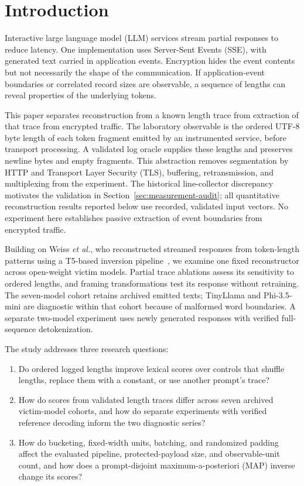 \documentclass[electronics,article,submit,pdftex,moreauthors]{Definitions/mdpi}
\begin{document}
\section{Introduction}
Interactive large language model (LLM) services stream partial responses to reduce latency. One implementation uses Server-Sent Events (SSE), with generated text carried in application events. Encryption hides the event contents but not necessarily the shape of the communication. If application-event boundaries or correlated record sizes are observable, a sequence of lengths can reveal properties of the underlying tokens.

This paper separates reconstruction from a known length trace from extraction of that trace from encrypted traffic. The laboratory observable is the ordered UTF-8 byte length of each token fragment emitted by an instrumented service, before transport processing. A validated log oracle supplies these lengths and preserves newline bytes and empty fragments. This abstraction removes segmentation by HTTP and Transport Layer Security (TLS), buffering, retransmission, and multiplexing from the experiment. The historical line-collector discrepancy motivates the validation in Section~\ref{sec:measurement-audit}; all quantitative reconstruction results reported below use recorded, validated input vectors. No experiment here establishes passive extraction of event boundaries from encrypted traffic.

Building on Weiss \emph{et al.}, who reconstructed streamed responses from token-length patterns using a T5-based inversion pipeline~\cite{weiss2024prompt}, we examine one fixed reconstructor across open-weight victim models. Partial trace ablations assess its sensitivity to ordered lengths, and framing transformations test its response without retraining. The seven-model cohort retains archived emitted texts; TinyLlama and Phi-3.5-mini are diagnostic within that cohort because of malformed word boundaries. A separate two-model experiment uses newly generated responses with verified full-sequence detokenization.

The study addresses three research questions:
\begin{enumerate}[label=\textbf{RQ\arabic*:},leftmargin=4.2em,labelwidth=3.2em,labelsep=0.6em]
    \item Do ordered logged lengths improve lexical scores over controls that shuffle lengths, replace them with a constant, or use another prompt's trace?
    \item How do scores from validated length traces differ across seven archived victim-model cohorts, and how do separate experiments with verified reference decoding inform the two diagnostic series?
    \item How do bucketing, fixed-width units, batching, and randomized padding affect the evaluated pipeline, protected-payload size, and observable-unit count, and how does a prompt-disjoint maximum-a-posteriori (MAP) inverse change its scores?
\end{enumerate}
\end{document}
